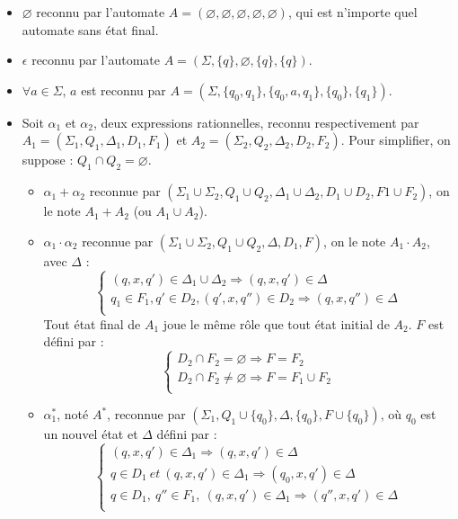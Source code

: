 \begin{itemize}
	\begin{itemize}
		\item $\varnothing$ reconnu par l'automate $A=(\varnothing,\varnothing,\varnothing,\varnothing,\varnothing)$, qui est n'importe quel automate sans état final.
		\item $\epsilon$ reconnu par l'automate $A=(\Sigma, \{q\} , \varnothing ,\{q\} , \{q\})$.
		\item $\forall a \in \Sigma$, $a$ est reconnu par $A=(\Sigma , \{q_0,q_1\} , \{q_0,a,q_1\} , \{q_0\} , \{q_1\})$.
		\item Soit $\alpha_1$ et $\alpha_2$, deux expressions rationnelles, reconnu respectivement par $A_1=(\Sigma_1 , Q_1 , \Delta_1 , D_1 , F_1)$ et $A_2=(\Sigma_2 , Q_2 , \Delta_2 , D_2 , F_2)$. Pour simplifier, on suppose : $Q_1 \cap Q_2 = \varnothing$.
		\begin{itemize}
			\item $\alpha_1 + \alpha_2$ reconnue par $(\Sigma_1 \cup \Sigma_2 , Q_1 \cup Q_2 , \Delta_1 \cup \Delta_2 , D_1 \cup D_2 , F1 \cup F_2)$, on le note $A_1 + A_2$ (ou $A_1 \cup A_2$).
			\item $\alpha_1 \cdot \alpha_2$ reconnue par $(\Sigma_1 \cup \Sigma_2 , Q_1 \cup Q_2 , \Delta , D_1 , F)$, on le note $A_1 \cdot A_2$, avec $\Delta$ :\\
			\[
				\left \{
				\begin{array}{cc}
					(q,x,q') \in \Delta_1 \cup \Delta_2 \Rightarrow (q,x,q') \in \Delta\\
					q_1 \in F_1 , q' \in D_2 , (q',x,q'') \in D_2 \Rightarrow (q,x,q'') \in \Delta\\
				\end{array}
				\right .
			\]
			Tout état final de $A_1$ joue le même rôle que tout état initial de $A_2$. $F$ est défini par :\\
			\[
				\left \{
				\begin{array}{cc}
					D_2 \cap F_2 = \varnothing \Rightarrow F=F_2\\
					D_2 \cap F_2 \not = \varnothing \Rightarrow F=F_1 \cup F_2\\
				\end{array}
				\right .
			\]
			\item $\alpha_1^*$, noté $A^*$, reconnue par $(\Sigma_1 , Q_1 \cup \{q_0\} , \Delta , \{q_0\} , F \cup \{q_0\})$, où $q_0$ est un nouvel état et $\Delta$ défini par :
			\[
				\left \{
				\begin{array}{ccc}
					(q,x,q') \in \Delta_1 \Rightarrow (q,x,q') \in \Delta\\
					q \in D_1\ et\ (q,x,q') \in \Delta_1 \Rightarrow (q_0,x,q') \in \Delta\\
					q \in D_1,\ q''\in F_1,\ (q,x,q') \in \Delta_1 \Rightarrow (q'',x,q') \in \Delta\\
				\end{array}
				\right .
			\]			
		\end{itemize}
	\end{itemize}


\end{itemize}
